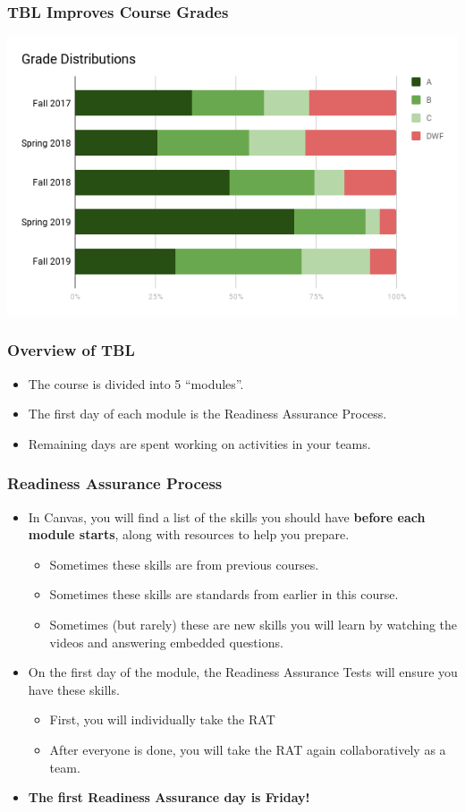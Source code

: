 \documentclass[aspectration=1610]{beamer}
\begin{document}
  
  \begin{frame}\frametitle{TBL Improves Course Grades}
  
  \begin{center}
  \includegraphics[scale=0.5]{grades.png}
  \end{center}
  \end{frame}
  
  \begin{frame}\frametitle{Overview of TBL}
  \begin{itemize}
  \item The course is divided into 5 ``modules''.
  \item The first day of each module is the Readiness Assurance Process.
  \item Remaining days are spent working on activities in your teams.
  \end{itemize}
  \end{frame}

  \begin{frame}\frametitle{Readiness Assurance Process}
  \begin{itemize}
  \item In Canvas, you will find a list of the skills you should have {\bf before each module starts}, along with resources to help you prepare.
  \begin{itemize}
  \item Sometimes these skills are from previous courses.
  \item Sometimes these skills are standards from earlier in this course.
    \item Sometimes (but rarely) these are new skills you will learn by watching the videos and answering embedded questions.
  \end{itemize}
  \pause \item On the first day of the module, the Readiness Assurance Tests will ensure you have these skills.
  \begin{itemize}
  \item First, you will individually take the RAT
  \item After everyone is done, you will take the RAT again collaboratively as a team.
  \end{itemize}
  \item {\bf The first Readiness Assurance day is Friday!}
  \end{itemize}
  \end{frame}
  
\end{document}
